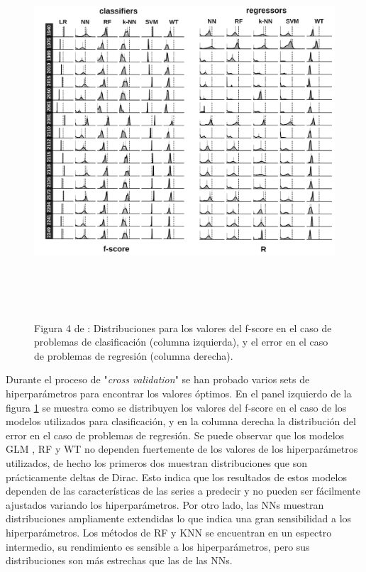\documentclass[12pt]{article}
\begin{document}
\begin{figure}[h!]
\centering
\includegraphics[height=5.5in]{figures/Manu_res0.PNG}
\caption{Figura 4 de \citet{Manuel}: Distribuciones para los valores del f-score en el caso de problemas de clasificación (columna izquierda), y el error en el caso de problemas de regresión (columna derecha).}
\label{Manu_res0}
\end{figure}

Durante el proceso de "\textit{cross validation}" se han probado varios sets de hiperparámetros para encontrar los valores óptimos. En el panel izquierdo de la figura \ref{Manu_res0} se muestra como se distribuyen los valores del f-score en el caso de los modelos utilizados para clasificación, y en la columna derecha la distribución del error en el caso de problemas de regresión. Se puede observar que los modelos GLM , RF y WT no dependen fuertemente de los valores de los hiperparámetros utilizados, de hecho los primeros dos muestran distribuciones que son prácticamente deltas de Dirac. Esto indica que los resultados de estos modelos dependen de las características de las series a predecir y no pueden ser fácilmente ajustados variando los hiperparámetros. Por otro lado, las NNs muestran distribuciones ampliamente extendidas lo que indica una gran sensibilidad a los hiperparámetros. Los métodos de RF y KNN se encuentran en un espectro intermedio, su rendimiento es sensible a los hiperparámetros, pero sus distribuciones son más estrechas que las de las NNs.
\end{document}
